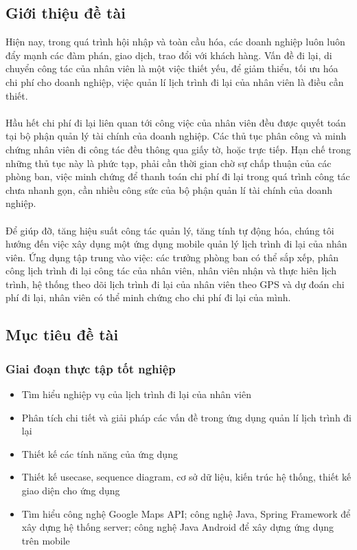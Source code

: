 \documentclass[a4paper]{article}
\begin{document}
\subsection{Giới thiệu đề tài}
Hiện nay, trong quá trình hội nhập và toàn cầu hóa, các doanh nghiệp luôn luôn đẩy mạnh các đàm phán, giao dịch, trao đổi với khách hàng. Vấn đề đi lại, di chuyển công tác của nhân viên là một việc thiết yếu, để giảm thiểu, tối ưu hóa chi phí cho doanh nghiệp, việc quản
lí lịch trình đi lại của nhân viên là điều cần thiết.\\
\\
Hầu hết chi phí đi lại liên quan tới công việc của nhân viên đều được quyết toán tại bộ phận quản lý tài chính của doanh nghiệp. Các thủ tục phân công và minh chứng nhân viên đi công tác đều thông qua giấy tờ, hoặc trực tiếp. Hạn chế trong những thủ tục này là phức tạp,
phải cần thời gian chờ sự chấp thuận của các phòng ban, việc minh chứng để thanh toán chi phí đi lại trong quá trình công tác chưa nhanh gọn, cần nhiều công sức của bộ phận quản lí tài chính của doanh nghiệp.\\
\\
Để giúp đỡ, tăng hiệu suất công tác quản lý, tăng tính tự động hóa, chúng tôi hướng đến việc xây dụng một ứng dụng mobile quản lý lịch trình đi lại của nhân viên. Ứng dụng tập trung vào việc: các trưởng phòng ban có thể sắp xếp, phân công lịch trình đi lại công tác của
nhân viên, nhân viên nhận và thực hiên lịch trình, hệ thống theo dõi lịch trình đi lại của nhân viên theo GPS và dự đoán chi phí đi lại, nhân viên có thể minh chứng cho chi phí đi lại của mình.
\subsection{Mục tiêu đề tài}
\subsubsection{Giai đoạn thực tập tốt nghiệp}
\begin{itemize}    
    \item Tìm hiểu nghiệp vụ của lịch trình đi lại của nhân viên
    \item Phân tích chi tiết và giải pháp các vấn đề trong ứng dụng quản lí lịch trình đi lại
    \item Thiết kế các tính năng của ứng dụng
    \item Thiết kế usecase, sequence diagram, cơ sở dữ liệu, kiến trúc hệ thống, thiết kế giao diện cho ứng dụng
    \item Tìm hiểu công nghệ Google Maps API; công nghệ Java, Spring Framework để xây dựng hệ thống server; công nghệ Java Android để xây dựng ứng dụng trên mobile
\end{itemize}
\end{document}
